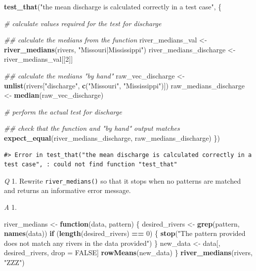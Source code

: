 \documentclass[
]{book}
\newenvironment{Shaded}{\begin{snugshade}}{\end{snugshade}}
\newcommand{\CommentTok}[1]{\textcolor[rgb]{0.56,0.35,0.01}{\textit{#1}}}
\newcommand{\ControlFlowTok}[1]{\textcolor[rgb]{0.13,0.29,0.53}{\textbf{#1}}}
\newcommand{\DecValTok}[1]{\textcolor[rgb]{0.00,0.00,0.81}{#1}}
\newcommand{\KeywordTok}[1]{\textcolor[rgb]{0.13,0.29,0.53}{\textbf{#1}}}
\newcommand{\NormalTok}[1]{#1}
\newcommand{\OperatorTok}[1]{\textcolor[rgb]{0.81,0.36,0.00}{\textbf{#1}}}
\newcommand{\OtherTok}[1]{\textcolor[rgb]{0.56,0.35,0.01}{#1}}
\newcommand{\StringTok}[1]{\textcolor[rgb]{0.31,0.60,0.02}{#1}}
\begin{document}
\begin{Shaded}
\begin{Highlighting}[]
\KeywordTok{test_that}\NormalTok{(}\StringTok{"the mean discharge is calculated correctly in a test case"}\NormalTok{, \{}
  
  \CommentTok{# calculate values required for the test for discharge}

  \CommentTok{## calculate the medians from the function}
\NormalTok{  river_medians_val <-}\StringTok{ }\KeywordTok{river_medians}\NormalTok{(rivers, }\StringTok{"Missouri|Mississippi"}\NormalTok{)}
\NormalTok{  river_medians_discharge <-}\StringTok{ }\NormalTok{river_medians_val[[}\DecValTok{2}\NormalTok{]]}

  \CommentTok{## calculate the medians "by hand"}
\NormalTok{  raw_vec_discharge <-}\StringTok{ }\KeywordTok{unlist}\NormalTok{(rivers[}\StringTok{"discharge"}\NormalTok{, }\KeywordTok{c}\NormalTok{(}\StringTok{"Missouri"}\NormalTok{, }\StringTok{"Mississippi"}\NormalTok{)])}
\NormalTok{  raw_medians_discharge <-}\StringTok{ }\KeywordTok{median}\NormalTok{(raw_vec_discharge)}
  
  \CommentTok{# perform the actual test for discharge}

  \CommentTok{## check that the function and "by hand" output matches}
  \KeywordTok{expect_equal}\NormalTok{(river_medians_discharge, raw_medians_discharge)}
\NormalTok{\})}
\end{Highlighting}
\end{Shaded}

\begin{verbatim}
#> Error in test_that("the mean discharge is calculated correctly in a test case", : could not find function "test_that"
\end{verbatim}

\emph{Q} 1. Rewrite \texttt{river\_medians()} so that it stops when no patterns are matched and returns an informative error message.

\emph{A} 1.

\begin{Shaded}
\begin{Highlighting}[]
\NormalTok{river_medians <-}\StringTok{ }\ControlFlowTok{function}\NormalTok{(data, pattern) \{}
\NormalTok{  desired_rivers <-}\StringTok{ }\KeywordTok{grep}\NormalTok{(pattern, }\KeywordTok{names}\NormalTok{(data))}
  \ControlFlowTok{if}\NormalTok{ (}\KeywordTok{length}\NormalTok{(desired_rivers) }\OperatorTok{==}\StringTok{ }\DecValTok{0}\NormalTok{) \{}
    \KeywordTok{stop}\NormalTok{(}\StringTok{"The pattern provided does not match any rivers in the data provided"}\NormalTok{)}
\NormalTok{  \}}
\NormalTok{  new_data <-}\StringTok{ }\NormalTok{data[, desired_rivers, drop =}\StringTok{ }\OtherTok{FALSE}\NormalTok{]}
  \KeywordTok{rowMeans}\NormalTok{(new_data)}
\NormalTok{\}}
\KeywordTok{river_medians}\NormalTok{(rivers, }\StringTok{"ZZZ"}\NormalTok{)}
\end{Highlighting}
\end{Shaded}
\end{document}
